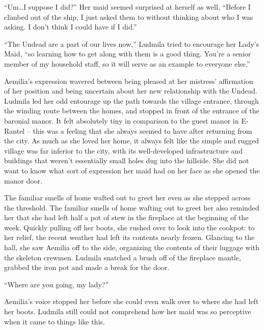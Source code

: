  

“Um…I suppose I did?” Her maid seemed surprised at herself as well, “Before I climbed out of the ship, I just asked them to without thinking about who I was asking. I don’t think I could have if I did.”

 

“The Undead are a part of our lives now,” Ludmila tried to encourage her Lady’s Maid, “so learning how to get along with them is a good thing. You’re a senior member of my household staff, so it will serve as an example to everyone else.”

 

Aemilia’s expression wavered between being pleased at her mistress’ affirmation of her position and being uncertain about her new relationship with the Undead. Ludmila led her odd entourage up the path towards the village entrance, through the winding route between the homes, and stopped in front of the entrance of the baronial manor. It felt absolutely tiny in comparison to the guest manor in E-Rantel – this was a feeling that she always seemed to have after returning from the city. As much as she loved her home, it always felt like the simple and rugged village was far inferior to the city, with its well-developed infrastructure and buildings that weren’t essentially small holes dug into the hillside. She did not want to know what sort of expression her maid had on her face as she opened the manor door.

 

The familiar smells of home wafted out to greet her even as she stepped across the threshold. The familiar smells of home wafting out to greet her also reminded her that she had left half a pot of stew in the fireplace at the beginning of the week. Quickly pulling off her boots, she rushed over to look into the cookpot: to her relief, the recent weather had left its contents nearly frozen. Glancing to the hall, she saw Aemilia off to the side, organizing the contents of their luggage with the skeleton crewmen. Ludmila snatched a brush off of the fireplace mantle, grabbed the iron pot and made a break for the door.

 

“Where are you going, my lady?”

 

Aemilia’s voice stopped her before she could even walk over to where she had left her boots. Ludmila still could not comprehend how her maid was so perceptive when it came to things like this.

